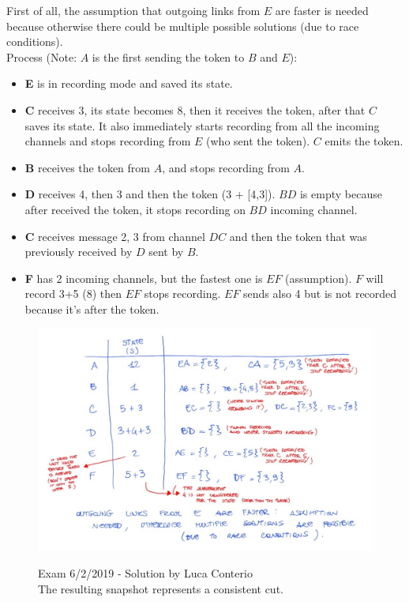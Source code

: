 \documentclass[10pt,a4paper]{article}
\begin{document}
First of all, the assumption that outgoing links from $E$ are faster is needed because otherwise there could be multiple possible solutions (due to race conditions). \\
Process (Note: $A$ is the first sending the token to $B$ and $E$):
\begin{itemize}
	\item \textbf{E} is in recording mode and saved its state.
	\item \textbf{C} receives 3, its state becomes 8, then it receives the token, after that $C$ saves its state. It also immediately starts recording from all the incoming channels and stops recording from $E$ (who sent the token). $C$ emits the token.
	\item \textbf{B} receives the token from $A$, and stops recording from $A$.
	\item \textbf{D} receives 4, then 3 and then the token (3 + [4,3]). $BD$ is empty because after received the token, it stops recording on $BD$ incoming channel.
	\item \textbf{C} receives message 2, 3 from channel $DC$ and then the token that was previously received by $D$ sent by $B$.
	\item \textbf{F} has 2 incoming channels, but the fastest one is $EF$ (assumption). $F$ will record 3+5 (8) then $EF$ stops recording. $EF$ sends also 4 but is not recorded because it's after the token.
\end{itemize} \pagebreak
\begin{figure}[h!]
 \hfill \includegraphics[width=350pt]{images/snap-ex-sol.jpeg}\hspace*{\fill}
  \label{fig:snap-sol}
  \caption{Exam 6/2/2019 - Solution by Luca Conterio \\ The resulting snapshot represents a consistent cut.}
\end{figure}
\end{document}
